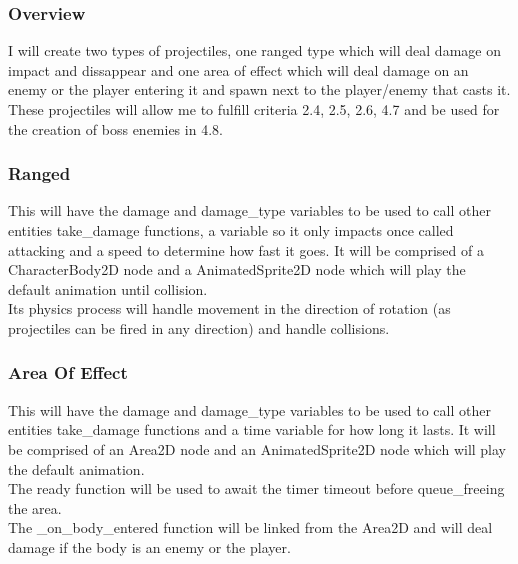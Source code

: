 \documentclass{article}
\begin{document}
        \subsubsection{Overview}
        I will create two types of projectiles, one ranged type which will deal damage on impact and dissappear and one area of effect which will deal damage on an enemy or the player entering it and spawn next to the player/enemy that casts it. These projectiles will allow me to fulfill criteria 2.4, 2.5, 2.6, 4.7 and be used for the creation of boss enemies in 4.8.\\
        \subsubsection{Ranged}
        This will have the damage and damage\_type variables to be used to call other entities take\_damage functions, a variable so it only impacts once called attacking and a speed to determine how fast it goes. It will be comprised of a CharacterBody2D node and a AnimatedSprite2D node which will play the default animation until collision.\\
        Its physics process will handle movement in the direction of rotation (as projectiles can be fired in any direction) and handle collisions.\\
        \subsubsection{Area Of Effect}
        This will have the damage and damage\_type variables to be used to call other entities take\_damage functions and a time variable for how long it lasts. It will be comprised of an Area2D node and an AnimatedSprite2D node which will play the default animation.\\
        The ready function will be used to await the timer timeout before queue\_freeing the area.\\
        The \_on\_body\_entered function will be linked from the Area2D and will deal damage if the body is an enemy or the player.\\
\end{document}
